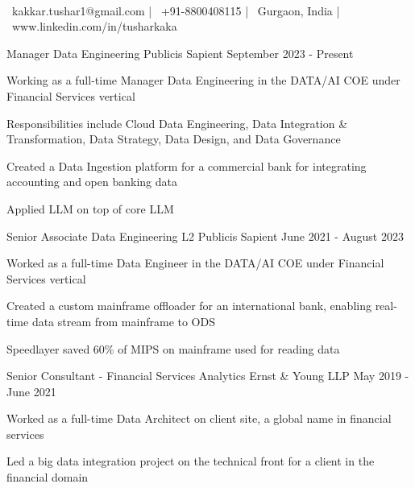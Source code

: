 \documentclass[]{awesome-cv}
\begin{document}
\begin{center}
	 \\
	\vspace{2mm}
     {\faEnvelope\ kakkar.tushar1@gmail.com} |      {\faMobile\ +91{-}8800408115} |      {\faMapMarker\ Gurgaon, India} |      {\faLink\ www.linkedin.com/in/tusharkaka} \
\end{center}


\begin{cventries}
	\cventry
	{ Manager Data Engineering  }
	{ Publicis Sapient  }
	{}
	{ September 2023 -   Present }
	{ \begin{cvitems} 		\item Working as a full{-}time Manager Data Engineering in the DATA/AI COE under Financial Services vertical
				\item Responsibilities include Cloud Data Engineering, Data Integration \& Transformation, Data Strategy, Data Design, and Data Governance
				\item Created a Data Ingestion platform for a commercial bank for integrating accounting and open banking data
				\item Applied LLM on top of core LLM
		 \end{cvitems} }
	\cventry
	{ Senior Associate Data Engineering L2  }
	{ Publicis Sapient  }
	{}
	{ June 2021 -   August 2023 }
	{ \begin{cvitems} 		\item Worked as a full{-}time Data Engineer in the DATA/AI COE under Financial Services vertical
				\item Created a custom mainframe offloader for an international bank, enabling real{-}time data stream from mainframe to ODS
				\item Speedlayer saved 60\% of MIPS on mainframe used for reading data
		 \end{cvitems} }
	\cventry
	{ Senior Consultant {-} Financial Services Analytics  }
	{ Ernst \& Young LLP  }
	{}
	{ May 2019 -   June 2021 }
	{ \begin{cvitems} 		\item Worked as a full{-}time Data Architect on client site, a global name in financial services
				\item Led a big data integration project on the technical front for a client in the financial domain

\end{cvitems}}
\end{cventries}
\end{document}
